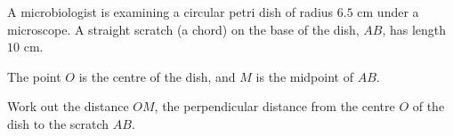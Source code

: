 \begin{question}
\noindent A microbiologist is examining a circular petri dish of radius $6.5$ cm under a microscope. A straight scratch (a chord) on the base of the dish, $AB$, has length $10$ cm.

The point $O$ is the centre of the dish, and $M$ is the midpoint of $AB$.

\begin{center}
\end{center}

\noindent Work out the distance $OM$, the perpendicular distance from the centre $O$ of the dish to the scratch $AB$.

\vspace{4.5cm}
\begin{flushright}
\end{flushright}
\end{question}

